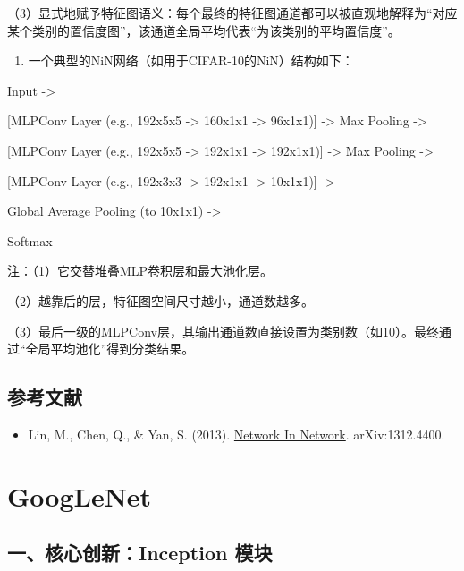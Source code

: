 （3）显式地赋予特征图语义：每个最终的特征图通道都可以被直观地解释为``对应某个类别的置信度图''，该通道全局平均代表``为该类别的平均置信度''。

\begin{enumerate}
\def\labelenumi{\arabic{enumi}.}
\setcounter{enumi}{2}
\tightlist
\item
  一个典型的NiN网络（如用于CIFAR-10的NiN）结构如下：
\end{enumerate}

Input -\textgreater{}

{[}MLPConv Layer (e.g., 192x5x5 -\textgreater{} 160x1x1 -\textgreater{} 96x1x1){]} -\textgreater{} Max Pooling -\textgreater{}

{[}MLPConv Layer (e.g., 192x5x5 -\textgreater{} 192x1x1 -\textgreater{} 192x1x1){]} -\textgreater{} Max Pooling -\textgreater{}

{[}MLPConv Layer (e.g., 192x3x3 -\textgreater{} 192x1x1 -\textgreater{} 10x1x1){]} -\textgreater{}

Global Average Pooling (to 10x1x1) -\textgreater{}

Softmax

注：（1）它交替堆叠MLP卷积层和最大池化层。

（2）越靠后的层，特征图空间尺寸越小，通道数越多。

（3）最后一级的MLPConv层，其输出通道数直接设置为类别数（如10）。最终通过``全局平均池化''得到分类结果。

\hypertarget{ux53c2ux8003ux6587ux732e-10}{%
\subsection{参考文献}\label{ux53c2ux8003ux6587ux732e-10}}

\begin{itemize}
\tightlist
\item
  Lin, M., Chen, Q., \& Yan, S. (2013). \href{https://arxiv.org/abs/1312.4400}{Network In Network}. arXiv:1312.4400.
\end{itemize}

\clearpage

\hypertarget{googlenet}{%
\section{GoogLeNet}\label{googlenet}}

\hypertarget{ux4e00ux6838ux5fc3ux521bux65b0inception-ux6a21ux5757}{%
\subsection{一、核心创新：Inception 模块}\label{ux4e00ux6838ux5fc3ux521bux65b0inception-ux6a21ux5757}}

